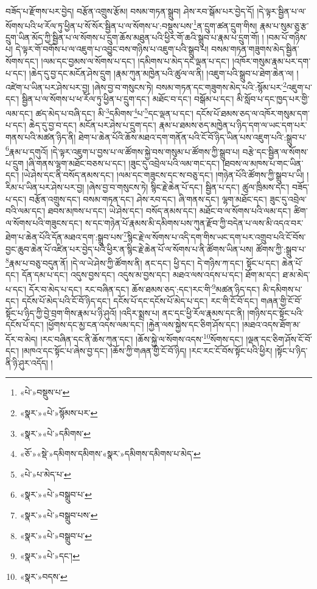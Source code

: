 བཟོད་པ་རྫོགས་པར་བྱེད། བརྩོན་འགྲུས་རྩོམ། བསམ་གཏན་སྒྲུབ། ཤེས་རབ་སྒོམ་པར་བྱེད་དོ། །དེ་ལྟར་སྦྱིན་པ་ལ་སོགས་པའི་ཕ་རོལ་ཏུ་ཕྱིན་པ་སོ་སོར་སྦྱིན་པ་ལ་སོགས་པ་:བསྡུས་པས་\footnote{«པེ་»བསྡུས་པ་}ན་དྲུག་ཚན་དྲུག་གིས། རྣམ་པ་སུམ་ཅུ་རྩ་དྲུག་ཡིན་མོད་ཀྱི་སྦྱིན་པ་ལ་སོགས་པ་དྲུག་ཆོས་མཐུན་པའི་ཕྱིར་གོ་ཆའི་སྒྲུབ་པ་རྣམ་པ་དྲུག་གོ། ། །བམ་པོ་གཉིས་པ། དེ་ལྟར་གོ་བགོས་པ་ལ་འཇུག་པ་འབྱུང་བས་གཉིས་པ་འཇུག་པའི་སྒྲུབ་པ། བསམ་གཏན་གཟུགས་མེད་སྦྱིན་སོགས་དང་། །ལམ་དང་བྱམས་ལ་སོགས་པ་དང་། །དམིགས་པ་མེད་དང་ལྡན་པ་དང་། །འཁོར་གསུམ་རྣམ་པར་དག་པ་དང་། །ཆེད་དུ་བྱ་དང་མངོན་ཤེས་དྲུག །རྣམ་ཀུན་མཁྱེན་པའི་ཚུལ་ལ་ནི། །འཇུག་པའི་སྒྲུབ་པ་ཐེག་ཆེན་ལ། །འཛེག་པ་ཡིན་པར་ཤེས་པར་བྱ། །ཞེས་བྱ་བ་གསུངས་ཏེ། བསམ་གཏན་དང་གཟུགས་མེད་པའི་:སྙོམ་པར་\footnote{«སྣར་»«པེ་»སྙོམས་པར་}འཇུག་པ་དང་། སྦྱིན་པ་ལ་སོགས་པ་ཕ་རོལ་ཏུ་ཕྱིན་པ་དྲུག་དང་། མཐོང་བ་དང་། བསྒོམ་པ་དང་། མི་སློབ་པ་དང་ཁྱད་པར་གྱི་ལམ་དང་། ཚད་མེད་པ་བཞི་དང་། མི་\footnote{«སྣར་»«པེ་»དམིགས་}དམིགས་\footnote{«ཅོ་»«སྡེ་»དམིགས་དམིགས་«སྣར་»དམིགས་དམིགས་པ་མེད་}པ་\footnote{«པེ་»པ་མེད་པ་}དང་ལྡན་པ་དང་། དངོས་པོ་ཐམས་ཅད་ལ་འཁོར་གསུམ་དག་པ་དང་། ཆེད་དུ་བྱ་བ་དང་། མངོན་པར་ཤེས་པ་དྲུག་དང་། རྣམ་པ་ཐམས་ཅད་མཁྱེན་པ་ཉིད་དག་ལ་ཡང་དག་པར་གནས་པའི་མཚན་ཉིད་ནི། ཐེག་པ་ཆེན་པོའི་ཆོས་མཐའ་དག་གནོན་པའི་ངོ་བོ་ཉིད་ཡིན་པས་འཇུག་པའི་:སྒྲུབ་པ་\footnote{«སྣར་»«པེ་»བསྒྲུབ་པ་}རྣམ་པ་དགུའོ། །དེ་ལྟར་འཇུག་པ་བྱས་པ་ལ་ཚོགས་སྐྱེ་བས་གསུམ་པ་ཚོགས་ཀྱི་སྒྲུབ་པ། བརྩེ་དང་སྦྱིན་ལ་སོགས་པ་དྲུག །ཞི་གནས་ལྷག་མཐོང་བཅས་པ་དང་། །ཟུང་དུ་འབྲེལ་པའི་ལམ་གང་དང་། །ཐབས་ལ་མཁས་པ་གང་ཡིན་དང་། །ཡེ་ཤེས་དང་ནི་བསོད་ནམས་དང་། །ལམ་དང་གཟུངས་དང་ས་བཅུ་དང་། །གཉེན་པོའི་ཚོགས་ཀྱི་སྒྲུབ་པ་ཡི། །རིམ་པ་ཡིན་པར་ཤེས་པར་བྱ། །ཞེས་བྱ་བ་གསུངས་ཏེ། སྙིང་རྗེ་ཆེན་པོ་དང་། སྦྱིན་པ་དང་། ཚུལ་ཁྲིམས་དང་། བཟོད་པ་དང་། བརྩོན་འགྲུས་དང་། བསམ་གཏན་དང་། ཤེས་རབ་དང་། ཞི་གནས་དང་། ལྷག་མཐོང་དང་། ཟུང་དུ་འབྲེལ་བའི་ལམ་དང་། ཐབས་མཁས་པ་དང་། ཡེ་ཤེས་དང་། བསོད་ནམས་དང་། མཐོང་བ་ལ་སོགས་པའི་ལམ་དང་། ཚིག་ལ་སོགས་པའི་གཟུངས་དང་། ས་དང་གཉེན་པོ་རྣམས་མི་དམིགས་པས་ཀུན་རྫོབ་ཀྱི་བདེན་པ་ལས་མི་འདའ་བར་ཐེག་པ་ཆེན་པོའི་དོན་མཐའ་དག་:སྒྲུབ་པས་\footnote{«སྣར་»«པེ་»བསྒྲུབ་པས་}སྙིང་རྗེ་ལ་སོགས་པ་འདི་དག་གིས་ཡང་དག་པར་འགྲུབ་པའི་ངོ་བོས་བྱང་ཆུབ་ཆེན་པོ་འཛིན་པར་བྱེད་པའི་ཕྱིར་ན་སྙིང་རྗེ་ཆེན་པོ་ལ་སོགས་པ་ནི་ཚོགས་ཡིན་པས། ཚོགས་ཀྱི་:སྒྲུབ་པ་\footnote{«སྣར་»«པེ་»བསྒྲུབ་པ་}རྣམ་པ་བཅུ་བདུན་ནོ། །དེ་ལ་ཡེ་ཤེས་ཀྱི་ཚོགས་ནི། ནང་དང་། ཕྱི་དང་། དེ་གཉིས་ཀ་དང་། སྟོང་པ་དང་། ཆེན་པོ་དང་། དོན་དམ་པ་དང་། འདུས་བྱས་དང་། འདུས་མ་བྱས་དང་། མཐའ་ལས་འདས་པ་དང་། ཐོག་མ་དང་། ཐ་མ་མེད་པ་དང་། དོར་བ་མེད་པ་དང་། རང་བཞིན་དང་། ཆོས་ཐམས་ཅད་:དང་།རང་གི་\footnote{«སྣར་»«པེ་»དང་།}མཚན་ཉིད་དང་། མི་དམིགས་པ་དང་། དངོས་པོ་མེད་པའི་ངོ་བོ་ཉིད་དང་། དངོས་པོ་དང་དངོས་པོ་མེད་པ་དང་། རང་གི་ངོ་བོ་དང་། གཞན་གྱི་ངོ་བོ་སྟོང་པ་ཉིད་ཀྱི་བྱེ་བྲག་གིས་རྣམ་པ་ཉི་ཤུའོ། །འདིར་སྨྲས་པ། ནང་དང་ཕྱི་རོལ་རྣམས་དང་ནི། །གཉིས་དང་སྟོང་པའི་དངོས་པོ་དང་། །ཕྱོགས་དང་མྱ་ངན་འདས་ལམ་དང་། །རྐྱེན་ལས་སྐྱེས་དང་ཅིག་ཤོས་དང་། །མཐའ་འདས་ཐོག་མ་དོར་བ་མེད། །རང་བཞིན་དང་ནི་ཆོས་ཀུན་དང་། །ཆོས་སྐྱེ་ལ་སོགས་འདས་\footnote{«སྣར་»བདས་}སོགས་དང་། །ལྡན་དང་ཅིག་ཤོས་ངོ་བོ་དང་། །མཁའ་དང་སྟོང་པ་ཞེས་བྱ་དང་། །ཆོས་ཀྱི་གཞན་གྱི་ངོ་བོ་ཉིད། །རང་རང་ངོ་བོས་སྟོང་པའི་ཕྱིར། །སྟོང་པ་ཉིད་ནི་ཉི་ཤུར་འདོད། །
